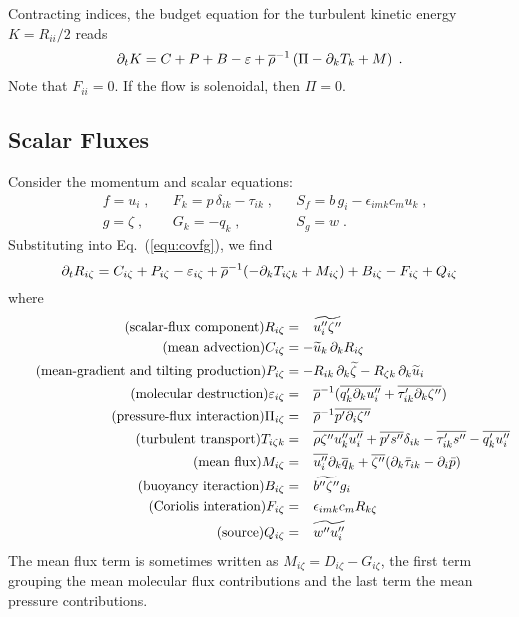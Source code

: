 Contracting indices, the budget equation for the turbulent kinetic energy $K=R_{ii}/2$ reads
\begin{equation}
  \pt{K}{t} = C +P +B -\varepsilon +\avr{\rho}^{-1} \left( \Pi -\pt{T_k}{k} +M \right)\;.
\end{equation}
Note that $F_{ii}=0$. If the flow is solenoidal, then $\Pi=0$.

\subsection{Scalar Fluxes}

Consider the momentum and scalar equations:
\begin{align}
  &f = u_i\;,   && F_k =p\,\delta_{ik}-\tau_{ik}\;,  && S_f = b\, g_i- \epsilon_{imk} c_m u_k\;,\\
  &g = \zeta\;, && G_k =-q_{k}\;,                    && S_g = w\;.
\end{align}
Substituting into Eq.~(\ref{equ:covfg}), we find
\begin{equation}\label{equ:Ris}
  \pt{R_{i \zeta}}{t}= C_{i\zeta} +P_{i\zeta} -\varepsilon_{i\zeta}
  +\avr{\rho}^{-1} ( -\pt{T_{i\zeta k}}{k} +M_{i\zeta} ) +B_{i\zeta} -F_{i\zeta} +Q_{i\zeta}
\end{equation}
where
\begin{align}
  \tag{scalar-flux component}
    R_{i\zeta}    &=\phantom{-} \avf{u_i''\zeta''} \\
  \tag{mean advection}
    C_{i\zeta}    &=-\avf{u}_k\,\pt{R_{i\zeta}}{k} \\
  \tag{mean-gradient and tilting production}
    P_{i\zeta}    &=-R_{ik}\,\pt{\avf{\zeta}}{k} -R_{\zeta k}\,\pt{\avf{u}_i}{k} \\
  \tag{molecular destruction}
    \varepsilon_{i\zeta} &=\phantom{-} \avr{\rho}^{-1} ( \avr{q_k'\pt{u_i''}{k}}
                                                        +\avr{\tau_{ik}' \pt{\zeta''}{k}} ) \\
  \tag{pressure-flux interaction}
    \Pi_{i\zeta}  &=\phantom{-} \avr{\rho}^{-1}\avr{p'\pt{\zeta''}{i}}\\
  \tag{\text{turbulent transport}}
    T_{i\zeta k}  &=\phantom{-} \avr{\rho \zeta''u''_ku''_i } +\avr{p's''}\delta_{ik}
                               -\avr{\tau'_{ik}s''}-\avr{q_k'u_i''}\\
  \tag{mean flux}
    M_{i\zeta}    &=\phantom{-} \avr{u''_i}\pt{\avr{q}_k}{k}
                               +\avr{\zeta''} ( \pt{\bar{\tau}_{ik}}{k} -\pt{\bar{p}}{i} ) \\
  \tag{buoyancy iteraction}
    B_{i\zeta}    &=\phantom{-} \avf{b''\zeta''}g_i \\
  \tag{Coriolis interation}
    F_{i\zeta}    &=\phantom{-} \epsilon_{imk} c_m R_{k\zeta} \\
  \tag{source}
    Q_{i\zeta}    &=\phantom{-} \avf{w''u_i''}
\end{align}
The mean flux term is sometimes written as $M_{i\zeta}=D_{i\zeta}-G_{i\zeta}$, the first term grouping the mean molecular flux contributions and the last term the mean pressure contributions.

